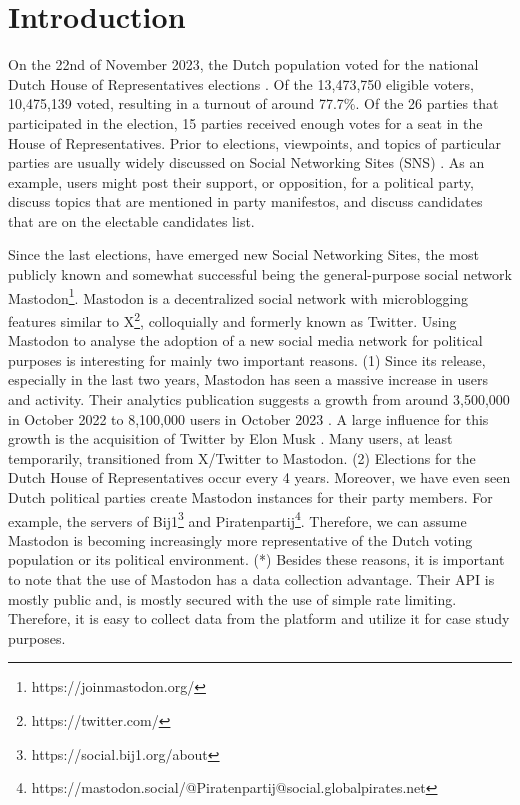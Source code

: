 \section{Introduction}
On the 22nd of November 2023, the Dutch population voted for the national Dutch House of Representatives elections \cite{kies}.
Of the 13,473,750 eligible voters, 10,475,139 voted, resulting in a turnout of around 77.7\%.
Of the 26 parties that participated in the election, 15 parties received enough votes for a seat in the House of Representatives.
Prior to elections, viewpoints, and topics of particular parties are usually widely discussed on Social Networking Sites (SNS) \cite{functions}.
As an example, users might post their support, or opposition, for a political party, discuss topics that are mentioned in party manifestos, and discuss candidates that are on the electable candidates list.

Since the last elections, have emerged new Social Networking Sites, the most publicly known and somewhat successful being the general-purpose social network \cite{characteristics} Mastodon\footnote{https://joinmastodon.org/}. Mastodon is a decentralized social network with microblogging features similar to X\footnote{https://twitter.com/}, colloquially and formerly known as Twitter.
Using Mastodon to analyse the adoption of a new social media network for political purposes is interesting for mainly two important reasons. 
(1) Since its release, especially in the last two years, Mastodon has seen a massive increase in users and activity.
Their analytics publication suggests a growth from around 3,500,000 in October 2022 to 8,100,000 users in October 2023 \cite{analytics}.
A large influence for this growth is the acquisition of Twitter by Elon Musk \cite{musk}.
Many users, at least temporarily, transitioned from X/Twitter to Mastodon.
(2) Elections for the Dutch House of Representatives occur every 4 years.
Moreover, we have even seen Dutch political parties create Mastodon instances for their party members.
For example, the servers of Bij1\footnote{https://social.bij1.org/about} and Piratenpartij\footnote{https://mastodon.social/@Piratenpartij@social.globalpirates.net}.
Therefore, we can assume Mastodon is becoming increasingly more representative of the Dutch voting population or its political environment.
(*) Besides these reasons, it is important to note that the use of Mastodon has a data collection advantage.
Their API is mostly public and, is mostly secured with the use of simple rate limiting.
Therefore, it is easy to collect data from the platform and utilize it for case study purposes.

